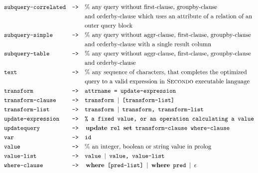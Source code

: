 \begin{align*}
&\texttt{subquery-correlated}&\texttt{-->}\quad &\text{\% any query without first-clause, groupby-clause }\\
&&&\text{and orderby-clause which uses an attribute of a relation of an} \\
&&&\text{outer query block} \\
&\texttt{subquery-simple}&\texttt{-->}\quad &\text{\% any query without aggr-clause, first-clause, groupby-clause }\\
&&&\text{and orderby-clause with a single result column} \\
&\texttt{subquery-table}&\texttt{-->}\quad &\text{\% any query without aggr-clause, first-clause, groupby-clause }\\
&&&\text{and orderby-clause} \\
&\texttt{text}&\texttt{-->}\quad &\text{\% any sequence of characters, that completes the optimized} \\
&&&\text{query to a valid expression in } \textsc{Secondo} \text{ executable language}									\\
&\texttt{transform}&\texttt{-->}\quad &\texttt{attrname = update-expression}									\\
&\texttt{transform-clause}&\texttt{-->}\quad &\texttt{transform }	|\texttt{ [transform-list]}								\\
&\texttt{transform-list}&\texttt{-->}\quad &\texttt{transform }	|\texttt{ transform, transform-list}								\\
&\texttt{update-expression}&\texttt{-->}\quad &\texttt{\% a fixed value, or an operation calculating a value}									\\
&\texttt{updatequery}&\texttt{-->}\quad &\operatorname{\textbf{update}}\ \texttt{rel}\ \operatorname{\textbf{set}}\ \texttt{transform-clause where-clause}									\\
&\texttt{var }&\texttt{-->}\quad &\texttt{id}									\\
&\texttt{value}&\texttt{-->}\quad &\text{\% an integer, boolean or string value in prolog}									\\
&\texttt{value-list}&\texttt{-->}\quad &\texttt{value }	|\texttt{ value, value-list}								\\
&\texttt{where-clause}&\texttt{-->}\quad &\operatorname{\textbf{where}}\ \texttt{[pred-list] }	|\ \operatorname{\textbf{where}}\ \texttt{pred } |\ \operatorname{\textbf{$\epsilon$}}							\\			
\end{align*}

%
%
%